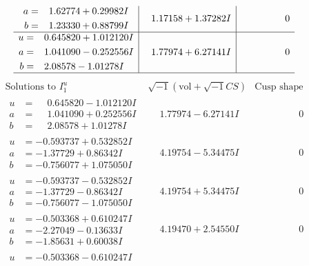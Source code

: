 \documentclass[1p]{elsarticle_modified}
\theoremstyle{definition}
\newcommand{\I}{\sqrt{-1}}
\begin{document}
$$\begin{array}{c|c|c}
\begin{aligned}
a &= \phantom{-}1.62774 + 0.29982 I \\
b &= \phantom{-}1.23330 + 0.88799 I\end{aligned}
 & \phantom{-}1.17158 + 1.37282 I & \phantom{-0.000000 } 0 \\ \hline\begin{aligned}
u &= \phantom{-}0.645820 + 1.012120 I \\
a &= \phantom{-}1.041090 - 0.252556 I \\
b &= \phantom{-}2.08578 - 1.01278 I\end{aligned}
 & \phantom{-}1.77974 + 6.27141 I & \phantom{-0.000000 } 0\\
 \hline 
 \end{array}$$\newpage$$\begin{array}{c|c|c}  
\text{Solutions to }I^u_{1}& \I (\text{vol} + \sqrt{-1}CS) & \text{Cusp shape}\\
 \hline 
\begin{aligned}
u &= \phantom{-}0.645820 - 1.012120 I \\
a &= \phantom{-}1.041090 + 0.252556 I \\
b &= \phantom{-}2.08578 + 1.01278 I\end{aligned}
 & \phantom{-}1.77974 - 6.27141 I & \phantom{-0.000000 } 0 \\ \hline\begin{aligned}
u &= -0.593737 + 0.532852 I \\
a &= -1.37729 + 0.86342 I \\
b &= -0.756077 + 1.075050 I\end{aligned}
 & \phantom{-}4.19754 - 5.34475 I & \phantom{-0.000000 } 0 \\ \hline\begin{aligned}
u &= -0.593737 - 0.532852 I \\
a &= -1.37729 - 0.86342 I \\
b &= -0.756077 - 1.075050 I\end{aligned}
 & \phantom{-}4.19754 + 5.34475 I & \phantom{-0.000000 } 0 \\ \hline\begin{aligned}
u &= -0.503368 + 0.610247 I \\
a &= -2.27049 - 0.13633 I \\
b &= -1.85631 + 0.60038 I\end{aligned}
 & \phantom{-}4.19470 + 2.54550 I & \phantom{-0.000000 } 0 \\ \hline\begin{aligned}
u &= -0.503368 - 0.610247 I \\

\end{aligned}
\end{array}$$
\end{document}
